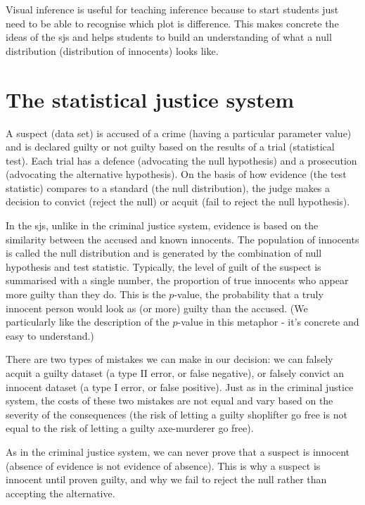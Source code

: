\documentclass[oneside]{article}
\begin{document}
Visual inference is useful for teaching inference because to start students just need to be able to recognise which plot is difference.  This makes concrete the ideas of the {\sc sjs} and helps students to build an understanding of what a null distribution (distribution of innocents) looks like.

\section{The statistical justice system}

A suspect (data set) is accused of a crime (having a particular parameter value) and is declared guilty or not guilty based on the results of a trial (statistical test). Each trial has a defence (advocating the null hypothesis) and a prosecution (advocating the alternative hypothesis). On the basis of how evidence (the test statistic) compares to a standard (the null distribution), the judge makes a decision to convict (reject the null) or acquit (fail to reject the null hypothesis).

In the {\sc sjs}, unlike in the criminal justice system, evidence is based on the similarity between the accused and known innocents. The population of innocents is called the null distribution and is generated by the combination of null hypothesis and test statistic. Typically, the level of guilt of the suspect is summarised with a single number, the proportion of true innocents who appear more guilty than they do. This is the $p$-value, the probability that a truly innocent person would look as (or more) guilty than the accused.  (We particularly like the description of the $p$-value in this metaphor - it's concrete and easy to understand.)

There are two types of mistakes we can make in our decision: we can falsely acquit a guilty dataset (a type II error, or false negative), or falsely convict an innocent dataset (a type I error, or false positive). Just as in the criminal justice system, the costs of these two mistakes are not equal and vary based on the severity of the consequences (the risk of letting a guilty shoplifter go free is not equal to the risk of letting a guilty axe-murderer go free). 

As in the criminal justice system, we can never prove that a suspect is innocent (absence of evidence is not evidence of absence). This is why a suspect is innocent until proven guilty, and why we fail to reject the null rather than accepting the alternative.
\end{document}
